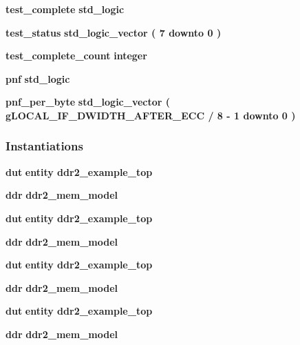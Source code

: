 \begin{DoxyCompactItemize}
\item 
{\bf test\+\_\+complete} {\bfseries \textcolor{comment}{std\+\_\+logic}\textcolor{vhdlchar}{ }} 
\item 
{\bf test\+\_\+status} {\bfseries \textcolor{comment}{std\+\_\+logic\+\_\+vector}\textcolor{vhdlchar}{ }\textcolor{vhdlchar}{(}\textcolor{vhdlchar}{ }\textcolor{vhdlchar}{ } \textcolor{vhdldigit}{7} \textcolor{vhdlchar}{ }\textcolor{keywordflow}{downto}\textcolor{vhdlchar}{ }\textcolor{vhdlchar}{ } \textcolor{vhdldigit}{0} \textcolor{vhdlchar}{ }\textcolor{vhdlchar}{)}\textcolor{vhdlchar}{ }} 
\item 
{\bf test\+\_\+complete\+\_\+count} {\bfseries \textcolor{comment}{integer}\textcolor{vhdlchar}{ }} 
\item 
{\bf pnf} {\bfseries \textcolor{comment}{std\+\_\+logic}\textcolor{vhdlchar}{ }} 
\item 
{\bf pnf\+\_\+per\+\_\+byte} {\bfseries \textcolor{comment}{std\+\_\+logic\+\_\+vector}\textcolor{vhdlchar}{ }\textcolor{vhdlchar}{(}\textcolor{vhdlchar}{ }\textcolor{vhdlchar}{ }\textcolor{vhdlchar}{ }\textcolor{vhdlchar}{ }{\bfseries {\bf g\+L\+O\+C\+A\+L\+\_\+\+I\+F\+\_\+\+D\+W\+I\+D\+T\+H\+\_\+\+A\+F\+T\+E\+R\+\_\+\+E\+CC}} \textcolor{vhdlchar}{/}\textcolor{vhdlchar}{ } \textcolor{vhdldigit}{8} \textcolor{vhdlchar}{-\/}\textcolor{vhdlchar}{ } \textcolor{vhdldigit}{1} \textcolor{vhdlchar}{ }\textcolor{keywordflow}{downto}\textcolor{vhdlchar}{ }\textcolor{vhdlchar}{ } \textcolor{vhdldigit}{0} \textcolor{vhdlchar}{ }\textcolor{vhdlchar}{)}\textcolor{vhdlchar}{ }} 
\end{DoxyCompactItemize}
\subsubsection*{Instantiations}
 \begin{DoxyCompactItemize}
\item 
{\bf dut}  {\bfseries entity ddr2\+\_\+example\+\_\+top}   
\item 
{\bf ddr}  {\bfseries ddr2\+\_\+mem\+\_\+model}   
\item 
{\bf dut}  {\bfseries entity ddr2\+\_\+example\+\_\+top}   
\item 
{\bf ddr}  {\bfseries ddr2\+\_\+mem\+\_\+model}   
\item 
{\bf dut}  {\bfseries entity ddr2\+\_\+example\+\_\+top}   
\item 
{\bf ddr}  {\bfseries ddr2\+\_\+mem\+\_\+model}   
\item 
{\bf dut}  {\bfseries entity ddr2\+\_\+example\+\_\+top}   
\item 
{\bf ddr}  {\bfseries ddr2\+\_\+mem\+\_\+model}   
\end{DoxyCompactItemize}


